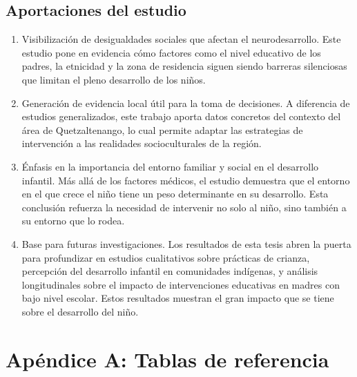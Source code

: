 \documentclass[11pt,letterpaper]{report}
\renewcommand{\thechapter}{\Roman{chapter}}
\begin{document}
\section{Aportaciones del estudio}
\begin{enumerate}
\item Visibilización de desigualdades sociales que afectan el neurodesarrollo. 
Este estudio pone en evidencia cómo factores como el nivel educativo de los 
padres, la etnicidad y la zona de residencia siguen siendo barreras silenciosas 
que limitan el pleno desarrollo de los niños. 

\item Generación de evidencia local útil para la toma de decisiones. A 
diferencia de estudios generalizados, este trabajo aporta datos concretos del 
contexto del área de Quetzaltenango, lo cual permite adaptar las estrategias 
de intervención a las realidades socioculturales de la región.

\item Énfasis en la importancia del entorno familiar y social en el desarrollo 
infantil. Más allá de los factores médicos, el estudio demuestra que el 
entorno en el que crece el niño tiene un peso determinante en su desarrollo. 
Esta conclusión refuerza la necesidad de intervenir no solo al niño, sino 
también a su entorno que lo rodea. 

\item Base para futuras investigaciones. Los resultados de esta tesis abren la 
puerta para profundizar en estudios cualitativos sobre prácticas de crianza, 
percepción del desarrollo infantil en comunidades indígenas, y análisis 
longitudinales sobre el impacto de intervenciones educativas en madres con 
bajo nivel escolar. Estos resultados muestran el gran impacto que se tiene 
sobre el desarrollo del niño. 
\end{enumerate}

\printbibliography

\cleardoublepage

\appendix

\setcounter{chapter}{0}

\renewcommand{\thechapter}{Apéndice \Alph{chapter}}
\chapter*{Apéndice A: Tablas de referencia}
\end{document}
